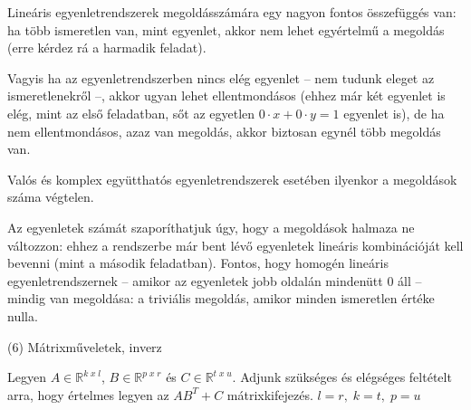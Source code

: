 \begin{frame}
  \begin{tcolorbox}[title={Megoldások {\symking}}]
Lineáris egyenletrendszerek megoldásszámára egy nagyon fontos összefüggés van: ha több ismeretlen van, mint egyenlet, akkor nem lehet egyértelmű a megoldás (erre kérdez rá a harmadik feladat).\\
\mmedskip

Vagyis ha az egyenletrendszerben nincs elég egyenlet – nem tudunk eleget az ismeretlenekről –, akkor ugyan lehet ellentmondásos (ehhez már két egyenlet is elég, mint az első feladatban, sőt az egyetlen $0 \cdot x + 0 \cdot y = 1$ egyenlet is), de ha nem ellentmondásos, azaz van megoldás, akkor biztosan egynél több megoldás van.\\
\mmedskip

Valós és komplex együtthatós egyenletrendszerek esetében ilyenkor a megoldások száma végtelen.\\
\mmedskip

Az egyenletek számát szaporíthatjuk úgy, hogy a megoldások halmaza ne változzon: ehhez a rendszerbe már bent lévő egyenletek lineáris kombinációját kell bevenni (mint a második feladatban). Fontos, hogy homogén lineáris egyenletrendszernek – amikor az egyenletek jobb oldalán mindenütt 0 áll – mindig van megoldása: a triviális megoldás, amikor minden ismeretlen értéke nulla.
  \end{tcolorbox}
\end{frame}



\begin{frame}[plain]
\begin{tcolorbox}[center, colback={myyellow}, coltext={black}, colframe={myyellow}]
    {\RHuge  (6) Mátrixműveletek, inverz }
    \mmedskip
\end{tcolorbox}
\end{frame}

\begin{frame}
  \begin{tcolorbox}[title={6/1. {\symknight}}]
    Legyen $A \in \mathbb{R}^{k \; x \; l}$, $B \in \mathbb{R}^{p \; x \; r}$ és $C \in \mathbb{R}^{t \; x \; u}$. Adjunk szükséges és elégséges feltételt arra, hogy értelmes legyen az $AB^T + C$ mátrixkifejezés.
  \tcblower
    $l = r, \; k = t, \; p = u$
  \end{tcolorbox}
\end{frame}


